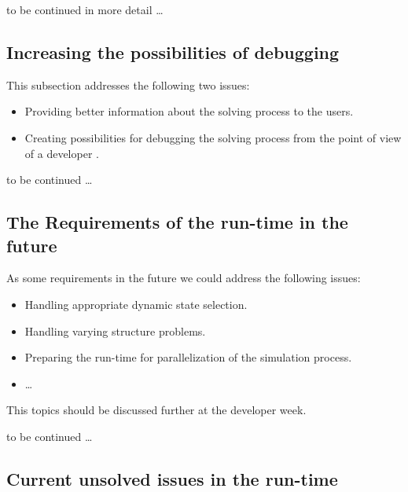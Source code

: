 to be continued in more detail \ldots

\subsection{Increasing the possibilities of debugging}\label{sec:debugging}

This subsection addresses the following two issues:
\begin{itemize}
  \item Providing better information about the solving process to the users.
  \item Creating possibilities for debugging the solving process from the
  point of view of a developer \cite{openmodelica.org:pop:sims:2007}.
\end{itemize}

to be continued \ldots

\subsection{The Requirements of the run-time in the
future}\label{sec:runtimefuture}

As some requirements in the future we could address the following issues:
\begin{itemize}
  \item Handling appropriate dynamic state selection.
  \item Handling varying structure problems.
  \item Preparing the run-time for parallelization of the simulation
  process.
 \item \ldots
\end{itemize}
This topics should be discussed further at the developer week.

to be continued \ldots

\subsection{Current unsolved issues in the run-time}\label{sec:currentsbugs}

